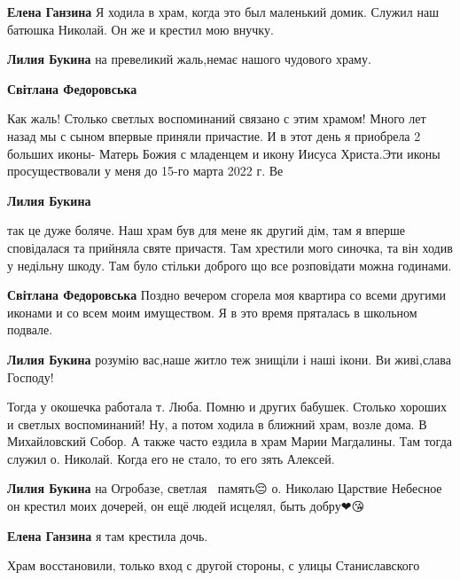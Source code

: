 \begin{itemize}
\begin{itemize}
\end{itemize} %

\textbf{Елена Ганзина} Я ходила в храм, когда это был маленький домик. Служил наш батюшка Николай. Он же и крестил мою внучку.

\begin{itemize} %
\textbf{Лилия Букина} на превеликий жаль,немає нашого чудового храму.

\textbf{Світлана Федоровська} 

Как жаль! Столько светлых воспоминаний связано с этим храмом! Много лет назад
мы с сыном впервые приняли причастие. И в этот день я приобрела 2 больших
иконы- Матерь Божия с младенцем и икону Иисуса Христа.Эти иконы просуществовали
у меня до 15-го марта 2022 г. Ве

\textbf{Лилия Букина} 

так це дуже боляче. Наш храм був для мене як другий дім, там я вперше
сповідалася та прийняла святе причастя. Там хрестили мого синочка, та він ходив
у недільну шкоду. Там було стільки доброго що все розповідати можна годинами.

\textbf{Світлана Федоровська} Поздно вечером сгорела моя квартира со всеми другими иконами и со всем моим имуществом. Я в это время пряталась в школьном подвале.

\textbf{Лилия Букина} розумію вас,наше житло теж знищіли і наші ікони. Ви живі,слава Господу!


Тогда у окошечка работала т. Люба. Помню и других бабушек. Столько хороших и
светлых воспоминаний! Ну, а потом ходила в ближний храм, возле дома. В
Михайловский Собор. А также часто ездила в храм Марии Магдалины. Там тогда
служил о. Николай. Когда его не стало, то его зять Алексей.

\textbf{Лилия Букина} на Огробазе, светлая🙏💕 память😔 о. Николаю Царствие Небесное он крестил моих дочерей, он ещё людей исцелял, быть добру❤😘
\end{itemize} %

\textbf{Елена Ганзина} я там крестила дочь.

\end{itemize} %


Храм восстановили, только вход с другой стороны, с улицы Станиславского

